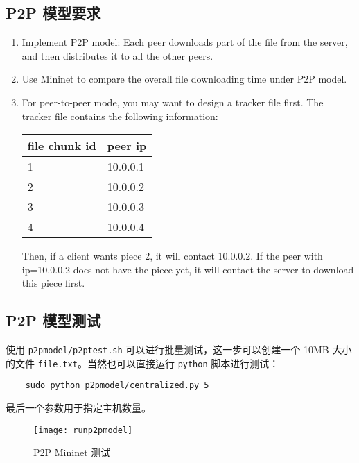 \subsection{P2P 模型要求}

\begin{enumerate}
    \item Implement P2P model: Each peer downloads part of the file from the server, and then distributes it to all the other peers.

    \item Use Mininet to compare the overall file downloading time under P2P model.
    
    \item For peer-to-peer mode, you may want to design a tracker file first. The tracker file contains the following information:
    
    \begin{table}[H]
    \centering
    \begin{tabular}{ll}
        \toprule
        file chunk id & peer ip \\
        \midrule
        1 & 10.0.0.1\\
        2 & 10.0.0.2\\
        3 & 10.0.0.3\\
        4 & 10.0.0.4\\
        \bottomrule
    \end{tabular}
    \end{table}

    Then, if a client wants piece 2, it will contact 10.0.0.2. If the peer with ip=10.0.0.2 does not have the piece yet, it will contact the server to download this piece first. 
\end{enumerate}

\subsection{P2P 模型测试}

使用 \verb"p2pmodel/p2ptest.sh" 可以进行批量测试，这一步可以创建一个 10MB 大小的文件 \verb"file.txt"。当然也可以直接运行 \verb"python" 脚本进行测试：
\begin{verbatim}
    sudo python p2pmodel/centralized.py 5
\end{verbatim}
最后一个参数用于指定主机数量。

\begin{figure}[H]
    \centering
    \texttt{[image: runp2pmodel]}
    \caption{P2P Mininet 测试}\label{fig:p2pmodelrun}
\end{figure}

